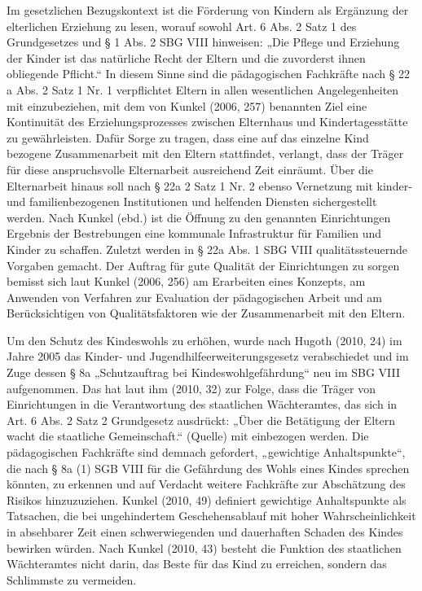 Im gesetzlichen Bezugskontext ist die Förderung von Kindern als Ergänzung der elterlichen Erziehung zu lesen, worauf sowohl Art. 6 Abs. 2 Satz 1 des Grundgesetzes und § 1 Abs. 2 SBG VIII hinweisen: „Die Pflege und Erziehung der Kinder ist das natürliche Recht der Eltern und die zuvorderst ihnen obliegende Pflicht.“ In diesem Sinne sind die pädagogischen Fachkräfte nach § 22 a Abs. 2 Satz 1 Nr. 1  verpflichtet Eltern in allen wesentlichen Angelegenheiten mit einzubeziehen, mit dem von Kunkel (2006, 257) benannten Ziel eine Kontinuität des Erziehungsprozesses zwischen Elternhaus und Kindertagesstätte zu gewährleisten. Dafür Sorge zu tragen, dass eine auf das einzelne Kind bezogene Zusammenarbeit mit den Eltern stattfindet, verlangt, dass der Träger für diese anspruchsvolle Elternarbeit ausreichend Zeit einräumt. Über die Elternarbeit hinaus soll nach § 22a 2 Satz 1 Nr. 2 ebenso Vernetzung mit kinder- und familienbezogenen Institutionen und helfenden Diensten sichergestellt werden. Nach Kunkel (ebd.) ist die Öffnung zu den genannten Einrichtungen Ergebnis der Bestrebungen eine kommunale Infrastruktur für Familien und Kinder zu schaffen. Zuletzt werden in § 22a Abs. 1 SBG VIII qualitätssteuernde Vorgaben gemacht.   Der Auftrag für gute Qualität der Einrichtungen zu sorgen bemisst sich laut Kunkel (2006, 256) am Erarbeiten eines Konzepts, am Anwenden von Verfahren zur Evaluation der pädagogischen Arbeit und am Berücksichtigen von Qualitätsfaktoren wie der Zusammenarbeit mit den Eltern.

Um den Schutz des Kindeswohls zu erhöhen, wurde nach Hugoth (2010, 24) im Jahre 2005 das Kinder- und Jugendhilfeerweiterungsgesetz verabschiedet und im Zuge dessen § 8a „Schutzauftrag bei Kindeswohlgefährdung“ neu im SBG VIII aufgenommen. Das hat laut ihm (2010, 32) zur Folge, dass die Träger von Einrichtungen in die Verantwortung des staatlichen Wächteramtes, das sich in Art. 6 Abs. 2 Satz 2 Grundgesetz ausdrückt: „Über die Betätigung der Eltern wacht die staatliche Gemeinschaft.“ (Quelle) mit einbezogen werden. Die pädagogischen Fachkräfte sind demnach gefordert, „gewichtige Anhaltspunkte“, die nach § 8a (1) SGB VIII für die Gefährdung des Wohls eines Kindes sprechen könnten, zu erkennen und auf Verdacht weitere Fachkräfte zur Abschätzung des Risikos hinzuzuziehen. Kunkel (2010, 49) definiert gewichtige Anhaltspunkte als Tatsachen, die bei ungehindertem Geschehensablauf mit hoher Wahrscheinlichkeit in absehbarer Zeit einen schwerwiegenden und dauerhaften Schaden des Kindes bewirken würden. Nach Kunkel (2010, 43) besteht die Funktion des staatlichen Wächteramtes nicht darin, das Beste für das Kind zu erreichen, sondern das Schlimmste zu vermeiden.

